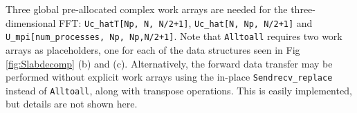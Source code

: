 \documentclass[11pt, oneside]{article}
\newcommand{\inpyth}{\lstinline[style=pythonstyle, basicstyle=\ttfamily]} %[]%
\begin{document}
Three global pre-allocated complex work arrays are needed for the three-dimensional FFT: 
\inpyth{Uc_hatT[Np, N, N/2+1]},  \inpyth{Uc_hat[N, Np, N/2+1]} and \inpyth{U_mpi[num_processes, Np, Np,N/2+1]}. 
Note that  \inpyth{Alltoall} requires two work arrays as placeholders, one for each of the data 
structures seen in Fig \ref{fig:Slabdecomp} (b) and (c). Alternatively, the forward data transfer may be 
performed without explicit work arrays using the in-place \inpyth{Sendrecv_replace} instead of 
\inpyth{Alltoall}, along with transpose operations. This is easily implemented, but details are not shown 
here.

\begin{figure}[t!]
\end{figure}
\end{document}

